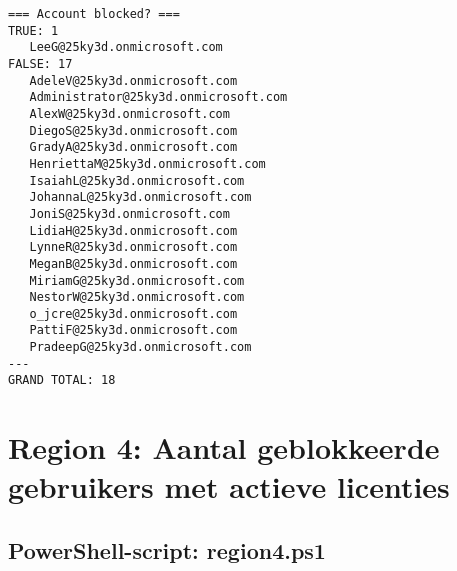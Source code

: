 \begin{scriptsize}
\begin{verbatim}
=== Account blocked? ===
TRUE: 1
   LeeG@25ky3d.onmicrosoft.com
FALSE: 17
   AdeleV@25ky3d.onmicrosoft.com
   Administrator@25ky3d.onmicrosoft.com
   AlexW@25ky3d.onmicrosoft.com
   DiegoS@25ky3d.onmicrosoft.com
   GradyA@25ky3d.onmicrosoft.com
   HenriettaM@25ky3d.onmicrosoft.com
   IsaiahL@25ky3d.onmicrosoft.com
   JohannaL@25ky3d.onmicrosoft.com
   JoniS@25ky3d.onmicrosoft.com
   LidiaH@25ky3d.onmicrosoft.com
   LynneR@25ky3d.onmicrosoft.com
   MeganB@25ky3d.onmicrosoft.com
   MiriamG@25ky3d.onmicrosoft.com
   NestorW@25ky3d.onmicrosoft.com
   o_jcre@25ky3d.onmicrosoft.com
   PattiF@25ky3d.onmicrosoft.com
   PradeepG@25ky3d.onmicrosoft.com
---
GRAND TOTAL: 18
\end{verbatim}
\end{scriptsize}

\clearpage

\section{Region 4: Aantal geblokkeerde gebruikers met actieve licenties}

\subsection{PowerShell-script: region4.ps1}

